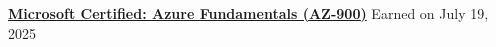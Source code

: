 \textbf{
    \href{https://learn.microsoft.com/en-us/credentials/certifications/azure-fundamentals/}{Microsoft Certified: Azure Fundamentals (AZ-900)}
}
\hfill Earned on July 19, 2025
